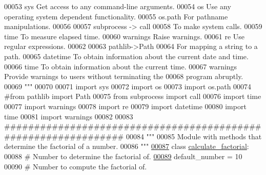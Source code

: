 \begin{DoxyCode}
00053 \textcolor{stringliteral}{    sys         Get access to any command-line arguments.}
00054 \textcolor{stringliteral}{    os          Use any operating system dependent functionality.}
00055 \textcolor{stringliteral}{    os.path     For pathname manipulations.}
00056 \textcolor{stringliteral}{}
00057 \textcolor{stringliteral}{    subprocess -> call}
00058 \textcolor{stringliteral}{                To make system calls.}
00059 \textcolor{stringliteral}{    time        To measure elapsed time.}
00060 \textcolor{stringliteral}{    warnings    Raise warnings.}
00061 \textcolor{stringliteral}{    re          Use regular expressions.}
00062 \textcolor{stringliteral}{}
00063 \textcolor{stringliteral}{    pathlib->Path}
00064 \textcolor{stringliteral}{                For mapping a string to a path.}
00065 \textcolor{stringliteral}{    datetime    To obtain information about the current date and time.}
00066 \textcolor{stringliteral}{    time    To obtain information about the current time.}
00067 \textcolor{stringliteral}{    warnings    Provide warnings to users without terminating the}
00068 \textcolor{stringliteral}{                    program abruptly.}
00069 \textcolor{stringliteral}{"""}
00070 
00071 \textcolor{keyword}{import} sys
00072 \textcolor{keyword}{import} os
00073 \textcolor{keyword}{import} os.path
00074 \textcolor{comment}{#from pathlib import Path}
00075 \textcolor{keyword}{from} subprocess \textcolor{keyword}{import} call
00076 \textcolor{keyword}{import} time
00077 \textcolor{keyword}{import} warnings
00078 \textcolor{keyword}{import} re
00079 \textcolor{keyword}{import} datetime
00080 \textcolor{keyword}{import} time
00081 \textcolor{keyword}{import} warnings
00082 
00083 \textcolor{comment}{###############################################################}
00084 \textcolor{stringliteral}{"""}
00085 \textcolor{stringliteral}{    Module with methods that determine the factorial of a number.}
00086 \textcolor{stringliteral}{"""}
\hypertarget{get__factorial_8py_source_l00087}{}\hyperlink{classutilities_1_1timing__measurements_1_1get__factorial_1_1calculate__factorial}{00087} \textcolor{keyword}{class }\hyperlink{classutilities_1_1timing__measurements_1_1get__factorial_1_1calculate__factorial}{calculate\_factorial}:
00088     \textcolor{comment}{# Number to determine the factorial of.}
\hypertarget{get__factorial_8py_source_l00089}{}\hyperlink{classutilities_1_1timing__measurements_1_1get__factorial_1_1calculate__factorial_a52e3407bbd93719d9c77e49706a47362}{00089}     default\_number = 10
00090     \textcolor{comment}{# Number to compute the factorial of.}

\end{DoxyCode}
